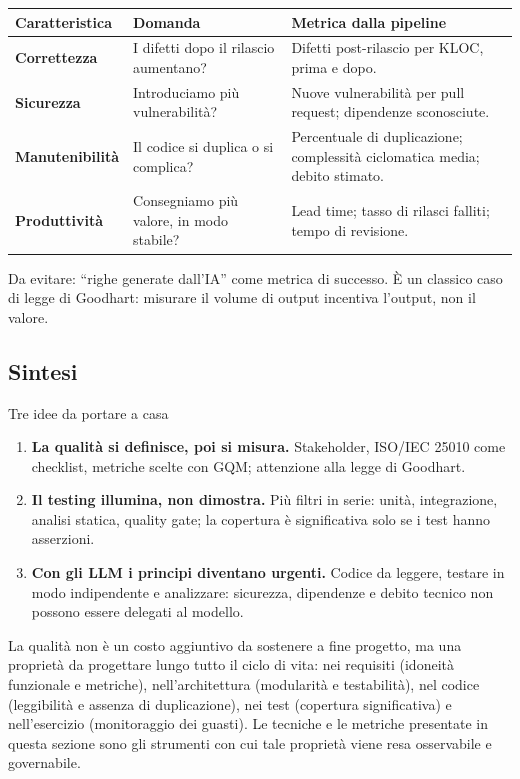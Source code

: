 \documentclass[12pt]{extarticle}
\begin{document}
\begin{center}
\small
\begin{tabular}{p{3.0cm}p{6.6cm}p{6.4cm}}
    \toprule
    \textbf{Caratteristica} & \textbf{Domanda} & \textbf{Metrica dalla pipeline} \\
    \midrule
    \textbf{Correttezza} & I difetti dopo il rilascio aumentano? & Difetti post-rilascio per KLOC, prima e dopo. \\
    \addlinespace
    \textbf{Sicurezza} & Introduciamo più vulnerabilità? & Nuove vulnerabilità per pull request; dipendenze sconosciute. \\
    \addlinespace
    \textbf{Manutenibilità} & Il codice si duplica o si complica? & Percentuale di duplicazione; complessità ciclomatica media; debito stimato. \\
    \addlinespace
    \textbf{Produttività} & Consegniamo più valore, in modo stabile? & Lead time; tasso di rilasci falliti; tempo di revisione. \\
    \bottomrule
\end{tabular}
\end{center}

\noindent Da evitare: ``righe generate dall'IA'' come metrica di successo. È un classico caso di legge di Goodhart: misurare il volume di output incentiva l'output, non il valore.

\subsection{Sintesi}

\begin{cbox}{Tre idee da portare a casa}
\begin{enumerate}
    \item \textbf{La qualità si definisce, poi si misura.} Stakeholder, ISO/IEC 25010 come checklist, metriche scelte con GQM; attenzione alla legge di Goodhart.
    \item \textbf{Il testing illumina, non dimostra.} Più filtri in serie: unità, integrazione, analisi statica, quality gate; la copertura è significativa solo se i test hanno asserzioni.
    \item \textbf{Con gli LLM i principi diventano urgenti.} Codice da leggere, testare in modo indipendente e analizzare: sicurezza, dipendenze e debito tecnico non possono essere delegati al modello.
\end{enumerate}
\end{cbox}

\noindent La qualità non è un costo aggiuntivo da sostenere a fine progetto, ma una proprietà da progettare lungo tutto il ciclo di vita: nei requisiti (idoneità funzionale e metriche), nell'architettura (modularità e testabilità), nel codice (leggibilità e assenza di duplicazione), nei test (copertura significativa) e nell'esercizio (monitoraggio dei guasti). Le tecniche e le metriche presentate in questa sezione sono gli strumenti con cui tale proprietà viene resa osservabile e governabile.
\end{document}
